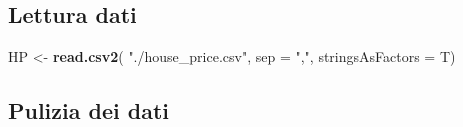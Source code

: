 \documentclass[
]{article}
\newenvironment{Shaded}{\begin{snugshade}}{\end{snugshade}}
\newcommand{\AttributeTok}[1]{\textcolor[rgb]{0.13,0.29,0.53}{#1}}
\newcommand{\FunctionTok}[1]{\textcolor[rgb]{0.13,0.29,0.53}{\textbf{#1}}}
\newcommand{\NormalTok}[1]{#1}
\newcommand{\OtherTok}[1]{\textcolor[rgb]{0.56,0.35,0.01}{#1}}
\newcommand{\StringTok}[1]{\textcolor[rgb]{0.31,0.60,0.02}{#1}}
\begin{document}
\subsection{Lettura dati}\label{lettura-dati-2}

\begin{Shaded}
\begin{Highlighting}[]
\NormalTok{HP }\OtherTok{\textless{}{-}} \FunctionTok{read.csv2}\NormalTok{(}
    \StringTok{"./house\_price.csv"}\NormalTok{, }
    \AttributeTok{sep =} \StringTok{","}\NormalTok{, }
    \AttributeTok{stringsAsFactors =}\NormalTok{ T)}
\end{Highlighting}
\end{Shaded}

\subsection{Pulizia dei dati}\label{pulizia-dei-dati-1}
\end{document}
